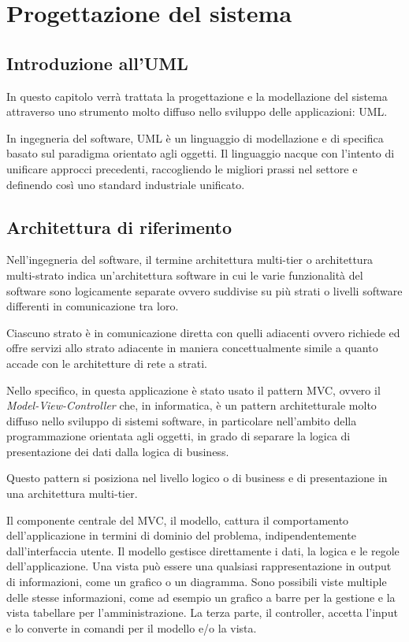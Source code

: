 \chapter{Progettazione del sistema}

\section{Introduzione all'UML}
In questo capitolo verrà trattata la progettazione e la modellazione del sistema attraverso uno strumento molto diffuso nello sviluppo delle applicazioni: UML. 


In ingegneria del software, UML è un linguaggio di modellazione e di specifica basato sul paradigma orientato agli oggetti. Il linguaggio nacque con l'intento di unificare approcci precedenti, raccogliendo le migliori prassi nel settore e definendo così uno standard industriale unificato.

\section{Architettura di riferimento}

Nell'ingegneria del software, il termine architettura multi-tier o architettura multi-strato indica un'architettura software in cui le varie funzionalità del software sono logicamente separate ovvero suddivise su più strati o livelli software differenti in comunicazione tra loro.

Ciascuno strato è in comunicazione diretta con quelli adiacenti ovvero richiede ed offre servizi allo strato adiacente in maniera concettualmente simile a quanto accade con le architetture di rete a strati.

Nello specifico, in questa applicazione è stato usato il pattern MVC, ovvero il \textit{Model-View-Controller} che, in informatica, è un pattern architetturale molto diffuso nello sviluppo di sistemi software, in particolare nell'ambito della programmazione orientata agli oggetti, in grado di separare la logica di presentazione dei dati dalla logica di business.

Questo pattern si posiziona nel livello logico o di business e di presentazione in una architettura multi-tier.

Il componente centrale del MVC, il modello, cattura il comportamento dell'applicazione in termini di dominio del problema, indipendentemente dall'interfaccia utente. Il modello gestisce direttamente i dati, la logica e le regole dell'applicazione. Una vista può essere una qualsiasi rappresentazione in output di informazioni, come un grafico o un diagramma. Sono possibili viste multiple delle stesse informazioni, come ad esempio un grafico a barre per la gestione e la vista tabellare per l'amministrazione. La terza parte, il controller, accetta l'input e lo converte in comandi per il modello e/o la vista.

